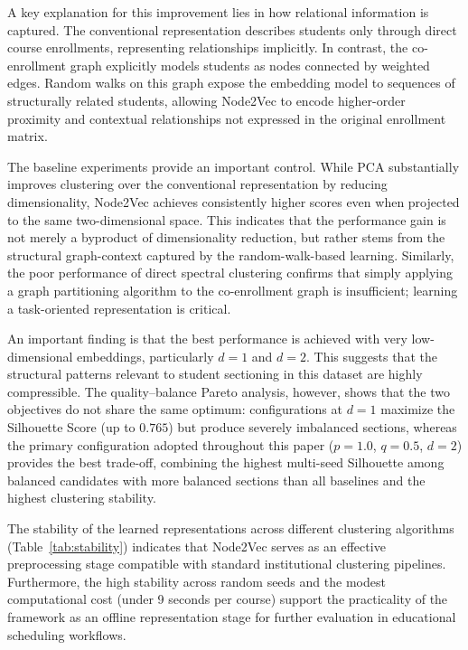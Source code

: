 \documentclass[pdflatex,sn-mathphys-num,iicol]{sn-jnl}%
\theoremstyle{thmstyleone}%
\theoremstyle{thmstyletwo}%
\theoremstyle{thmstylethree}%
\begin{document}
A key explanation for this improvement lies in how relational information is captured. The conventional representation describes students only through direct course enrollments, representing relationships implicitly. In contrast, the co-enrollment graph explicitly models students as nodes connected by weighted edges. Random walks on this graph expose the embedding model to sequences of structurally related students, allowing Node2Vec to encode higher-order proximity and contextual relationships not expressed in the original enrollment matrix. 

The baseline experiments provide an important control. While PCA substantially improves clustering over the conventional representation by reducing dimensionality, Node2Vec achieves consistently higher scores even when projected to the same two-dimensional space. This indicates that the performance gain is not merely a byproduct of dimensionality reduction, but rather stems from the structural graph-context captured by the random-walk-based learning. Similarly, the poor performance of direct spectral clustering confirms that simply applying a graph partitioning algorithm to the co-enrollment graph is insufficient; learning a task-oriented representation is critical.

An important finding is that the best performance is achieved with very low-dimensional embeddings, particularly $d=1$ and $d=2$. This suggests that the structural patterns relevant to student sectioning in this dataset are highly compressible. The quality--balance Pareto analysis, however, shows that the two objectives do not share the same optimum: configurations at $d=1$ maximize the Silhouette Score (up to $0.765$) but produce severely imbalanced sections, whereas the primary configuration adopted throughout this paper ($p=1.0$, $q=0.5$, $d=2$) provides the best trade-off, combining the highest multi-seed Silhouette among balanced candidates with more balanced sections than all baselines and the highest clustering stability.

The stability of the learned representations across different clustering algorithms (Table~\ref{tab:stability}) indicates that Node2Vec serves as an effective preprocessing stage compatible with standard institutional clustering pipelines. Furthermore, the high stability across random seeds and the modest computational cost (under 9 seconds per course) support the practicality of the framework as an offline representation stage for further evaluation in educational scheduling workflows.
\end{document}
